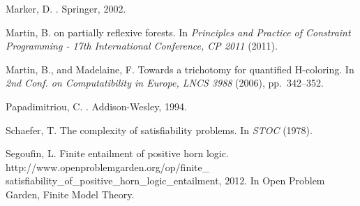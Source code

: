 \documentclass{LMCS}
\begin{document}
\begin{thebibliography}{10}
{\sc Marker, D.}
.
\newblock Springer, 2002.

{\sc Martin, B.}
 on partially reflexive forests.
\newblock In {\em Principles and Practice of Constraint Programming - 17th
  International Conference, CP 2011\/} (2011).

{\sc Martin, B., and Madelaine, F.}
\newblock Towards a trichotomy for quantified {H}-coloring.
\newblock In {\em 2nd Conf. on Computatibility in Europe, LNCS 3988\/} (2006),
  pp.~342--352.

{\sc Papadimitriou, C.}
.
\newblock Addison-Wesley, 1994.

{\sc Schaefer, T.}
\newblock The complexity of satisfiability problems.
\newblock In {\em STOC\/} (1978).

{\sc Segoufin, L.}
\newblock Finite entailment of positive horn logic.
\newblock
  http://www.openproblemgarden.org/op/finite\_ satisfiability\_of\_positive\_horn\_logic\_entailment,
  2012.
\newblock In Open Problem Garden, Finite Model Theory.

\end{thebibliography}
\end{document}
